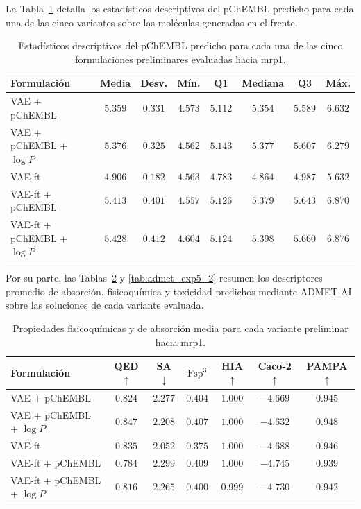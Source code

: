 La Tabla~\ref{tab:pchembl_exp5} detalla los estadísticos descriptivos del pChEMBL predicho para cada una de las cinco variantes sobre las moléculas generadas en el frente.

\begin{table}[htbp]
\centering
\caption{Estadísticos descriptivos del pChEMBL predicho para cada una de las cinco formulaciones preliminares evaluadas hacia \acrshort{mrp1}.}
\label{tab:pchembl_exp5}
\begin{tabular}{lccccccc}
\toprule
Formulación & Media & Desv. & Mín. & Q1 & Mediana & Q3 & Máx. \\
\midrule
VAE + pChEMBL & $5.359$ & $0.331$ & $4.573$ & $5.112$ & $5.354$ & $5.589$ & $6.632$ \\
VAE + pChEMBL + $\log P$ & $5.376$ & $0.325$ & $4.562$ & $5.143$ & $5.377$ & $5.607$ & $6.279$ \\
\midrule
VAE-ft & $4.906$ & $0.182$ & $4.563$ & $4.783$ & $4.864$ & $4.987$ & $5.632$ \\
VAE-ft + pChEMBL & $5.413$ & $0.401$ & $4.557$ & $5.126$ & $5.379$ & $5.643$ & $6.870$ \\
VAE-ft + pChEMBL + $\log P$ & $5.428$ & $0.412$ & $4.604$ & $5.124$ & $5.398$ & $5.660$ & $6.876$ \\
\bottomrule
\end{tabular}
\end{table}

Por su parte, las Tablas~\ref{tab:admet_exp5_1} y \ref{tab:admet_exp5_2} resumen los descriptores promedio de absorción, fisicoquímica y toxicidad predichos mediante ADMET-AI sobre las soluciones de cada variante evaluada.

\begin{table}[htbp]
\centering
\caption{Propiedades fisicoquímicas y de absorción media para cada variante preliminar hacia \acrshort{mrp1}.}
\label{tab:admet_exp5_1}
\begin{tabular}{lcccccc}
\toprule
Formulación & QED $\uparrow$ & SA $\downarrow$ & $\text{Fsp}^3$ & HIA $\uparrow$ & Caco-2 $\uparrow$ & PAMPA $\uparrow$ \\
\midrule
VAE + pChEMBL & $0.824$ & $2.277$ & $0.404$ & $1.000$ & $-4.669$ & $0.945$ \\
VAE + pChEMBL + $\log P$ & $0.847$ & $2.208$ & $0.407$ & $1.000$ & $-4.632$ & $0.948$ \\
\midrule
VAE-ft & $0.835$ & $2.052$ & $0.375$ & $1.000$ & $-4.688$ & $0.946$ \\
VAE-ft + pChEMBL & $0.784$ & $2.299$ & $0.409$ & $1.000$ & $-4.745$ & $0.939$ \\
VAE-ft + pChEMBL + $\log P$ & $0.816$ & $2.265$ & $0.400$ & $0.999$ & $-4.730$ & $0.942$ \\
\bottomrule
\end{tabular}
\end{table}

